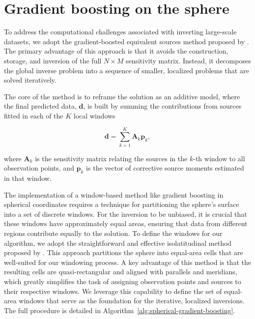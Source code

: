 \documentclass[a4paper,oneside,10pt]{book}
\begin{document}
\section{Gradient boosting on the sphere}

To address the computational challenges associated with inverting large-scale datasets, we adopt the
gradient-boosted equivalent sources method proposed by \citet{Soler2021}. The primary advantage of
this approach is that it avoids the construction, storage, and inversion of the full $N \times M$
sensitivity matrix. Instead, it decomposes the global inverse problem into a sequence of smaller,
localized problems that are solved iteratively.

The core of the method is to reframe the solution as an additive model, where the final predicted
data, $\mathbf{d}$, is built by summing the contributions from sources fitted in each of the $K$
local windows

\begin{equation}
    \mathbf{d} = \sum_{k=1}^{K} \mathbf{A}_k \mathbf{p}_k,
\end{equation}

\noindent
where $\mathbf{A}_k$ is the sensitivity matrix relating the sources in the $k$-th window to all
observation points, and $\mathbf{p}_k$ is the vector of corrective source moments estimated in that
window.

The implementation of a window-based method like gradient boosting in spherical coordinates requires
a technique for partitioning the sphere's surface into a set of discrete windows. For the inversion
to be unbiased, it is crucial that these windows have approximately equal areas, ensuring that data
from different regions contribute equally to the solution. To define the windows for our algorithm,
we adopt the straightforward and effective isolatitudinal method proposed by \citet{Malkin2016}.
This approach partitions the sphere into equal-area cells that are well-suited for our windowing process.
A key advantage of this method is that the resulting cells are quasi-rectangular and aligned with parallels
and meridians, which greatly simplifies the task of assigning observation points and sources to
their respective windows. We leverage this capability to define the set of equal-area windows that
serve as the foundation for the iterative, localized inversions. The full procedure is detailed in
Algorithm~\ref{alg:spherical-gradient-boosting}.
\end{document}
